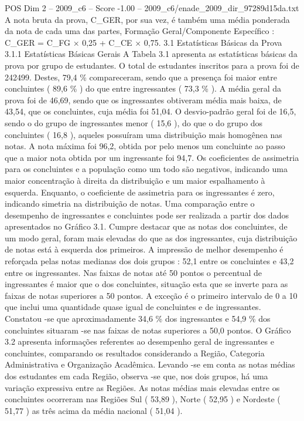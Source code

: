 \begin{textsample}{POS Dim 2 – 2009\_c6 – Score -1.00 – 2009\_c6/enade\_2009\_dir\_97289d15da.txt}
A nota bruta da prova, C\_GER, por sua vez, é também uma média ponderada da nota de cada uma das partes, Formação Geral/Componente Específico : C\_GER = C\_FG × 0,25 + C\_CE × 0,75. 3.1 Estatísticas Básicas da Prova 3.1.1 Estatísticas Básicas Gerais A Tabela 3.1 apresenta as estatísticas básicas da prova por grupo de estudantes.
O total de estudantes inscritos para a prova foi de 242499.
Destes, 79,4 \% compareceram, sendo que a presença foi maior entre concluintes ( 89,6 \% ) do que entre ingressantes ( 73,3 \% ).
A média geral da prova foi de 46,69, sendo que os ingressantes obtiveram média mais baixa, de 43,54, que os concluintes, cuja média foi 51,04.
O desvio-padrão geral foi de 16,5, sendo o do grupo de ingressantes menor ( 15,6 ), do que o do grupo dos concluintes ( 16,8 ), aqueles possuíram uma distribuição mais homogênea nas notas.
A nota máxima foi 96,2, obtida por pelo menos um concluinte ao passo que a maior nota obtida por um ingressante foi 94,7.
Os coeficientes de assimetria para os concluintes e a população como um todo são negativos, indicando uma maior concentração à direita da distribuição e um maior espalhamento à esquerda.
Enquanto, o coeficiente de assimetria para os ingressantes é zero, indicando simetria na distribuição de notas.
Uma comparação entre o desempenho de ingressantes e concluintes pode ser realizada a partir dos dados apresentados no Gráfico 3.1.
Cumpre destacar que as notas dos concluintes, de um modo geral, foram mais elevadas do que as dos ingressantes, cuja distribuição de notas está à esquerda dos primeiros.
A impressão de melhor desempenho é reforçada pelas notas medianas dos dois grupos : 52,1 entre os concluintes e 43,2 entre os ingressantes.
Nas faixas de notas até 50 pontos o percentual de ingressantes é maior que o dos concluintes, situação esta que se inverte para as faixas de notas superiores a 50 pontos.
A exceção é o primeiro intervalo de 0 a 10 que inclui uma quantidade quase igual de concluintes e de ingressantes.
Constatou -se que aproximadamente 34,6 \% dos ingressantes e 54,9 \% dos concluintes situaram -se nas faixas de notas superiores a 50,0 pontos.
O Gráfico 3.2 apresenta informações referentes ao desempenho geral de ingressantes e concluintes, comparando os resultados considerando a Região, Categoria Administrativa e Organização Acadêmica.
Levando -se em conta as notas médias dos estudantes em cada Região, observa -se que, nos dois grupos, há uma variação expressiva entre as Regiões.
As notas médias mais elevadas entre os concluintes ocorreram nas Regiões Sul ( 53,89 ), Norte ( 52,95 ) e Nordeste ( 51,77 ) as três acima da média nacional ( 51,04 ).

\end{textsample}
